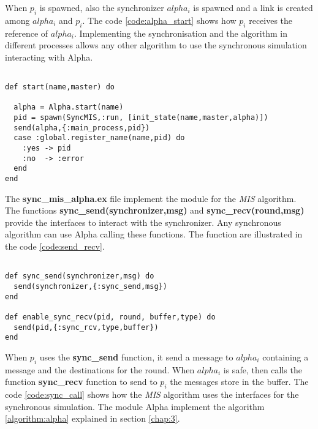 When $p_i$ is spawned, also the synchronizer $alpha_i$ is spawned and a link is created among $alpha_i$ and $p_i$. The code \ref{code:alpha_start} shows how $p_i$ receives the reference of $alpha_i$.  Implementing the synchronisation and the algorithm in different processes allows any other algorithm to use the synchronous simulation interacting with Alpha.  

\begin{lstlisting}[frame=single, columns=fullflexible, mathescape=true, caption= start function for Alpha implementation , label = code:alpha_start]

def start(name,master) do

  alpha = Alpha.start(name)
  pid = spawn(SyncMIS,:run, [init_state(name,master,alpha)])
  send(alpha,{:main_process,pid})
  case :global.register_name(name,pid) do
    :yes -> pid
    :no  -> :error
  end
end

\end{lstlisting}



The \textbf{sync\_mis\_alpha.ex} file implement the module for the \textit{MIS} algorithm. The functions \textbf{sync\_send(synchronizer,msg)} and \textbf{sync\_recv(round,msg)} provide the interfaces to interact with the synchronizer. Any synchronous algorithm can use Alpha calling these functions. The function are illustrated in the code \ref{code:send_recv}.

\begin{lstlisting}[frame=single, columns=fullflexible, mathescape=true, caption= Interface to call Alpha: Synchronous send and receive, label = code:send_recv]

def sync_send(synchronizer,msg) do
  send(synchronizer,{:sync_send,msg})
end

def enable_sync_recv(pid, round, buffer,type) do
  send(pid,{:sync_rcv,type,buffer})
end

\end{lstlisting}


When $p_i$ uses the \textbf{sync\_send} function, it send a message to $alpha_i$ containing a message and the destinations for the round. When $alpha_i$ is safe, then calls the function \textbf{sync\_recv} function to send to $p_i$ the messages store in the buffer. The code \ref{code:sync_call} shows how the \textit{MIS} algorithm uses the interfaces for the synchronous simulation. The module Alpha implement the algorithm \ref{algorithm:alpha} explained in section \ref{chap:3}.

